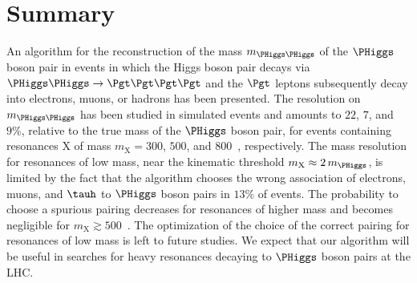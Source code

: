 \section{Summary}
\label{sec:summary}

An algorithm for the reconstruction of the mass $m_{\PHiggs\PHiggs}$ of the $\PHiggs$ boson pair 
in events in which the Higgs boson pair decays via $\PHiggs\PHiggs \to \Pgt\Pgt\Pgt\Pgt$
and the $\Pgt$ leptons subsequently decay into electrons, muons, or hadrons has been presented.
The resolution on $m_{\PHiggs\PHiggs}$ has been studied in simulated events 
and amounts to $22$, $7$, and $9\%$, relative to the true mass of the $\PHiggs$ boson pair,
for events containing resonances $\textrm{X}$ of mass $m_{\textrm{X}} = 300$, $500$, and $800$~\GeV, respectively.
The mass resolution for resonances of low mass, near the kinematic threshold $m_{\textrm{X}} \approx 2 \, m_{\PHiggs}$,
is limited by the fact that the algorithm chooses the wrong association of electrons, muons, and $\tauh$ 
to $\PHiggs$ boson pairs in $13\%$ of events.
The probability to choose a spurious pairing decreases for resonances of higher mass and becomes negligible for $m_{\textrm{X}} \gtrsim 500$~\GeV.
The optimization of the choice of the correct pairing for resonances of low mass is left to future studies.
We expect that our algorithm will be useful in searches for heavy resonances decaying to $\PHiggs$ boson pairs
at the LHC.
